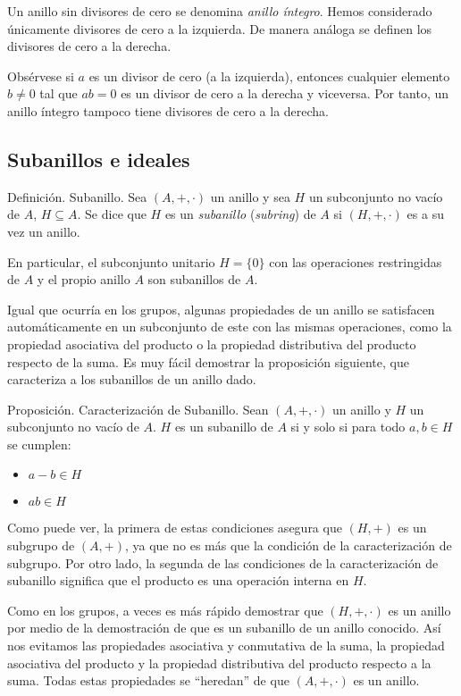 Un anillo sin divisores de cero se denomina \emph{anillo íntegro}. Hemos
considerado únicamente divisores de cero a la izquierda. De manera análoga
se definen los divisores de cero a la derecha.

Obsérvese si $a$ es un divisor de cero (a la izquierda), entonces cualquier
elemento $b \neq 0$ tal que $ab = 0$ es un divisor de cero a la derecha y
viceversa. Por tanto, un anillo íntegro tampoco tiene divisores de cero a la
derecha.




\subsection{Subanillos e ideales}

Definición. Subanillo. Sea $(A, +, \cdot)$ un anillo y sea $H$ un
subconjunto no vacío de $A$, $H \subseteq A$. Se dice que $H$ es un
\emph{subanillo} (\emph{subring}) de $A$ si $(H, +, \cdot)$ es a su vez un
anillo.

En particular, el subconjunto unitario $H = \{0\}$ con las operaciones
restringidas de $A$ y el propio anillo $A$ son subanillos de $A$.

Igual que ocurría en los grupos, algunas propiedades de un anillo se
satisfacen automáticamente en un subconjunto de este con las mismas
operaciones, como la propiedad asociativa del producto o la propiedad
distributiva del producto respecto de la suma. Es muy fácil demostrar la
proposición siguiente, que caracteriza a los subanillos de un anillo dado.

Proposición. Caracterización de Subanillo. Sean $(A, +, \cdot)$ un anillo y
$H$ un subconjunto no vacío de $A$. $H$ es un subanillo de $A$ si y solo si
para todo $a, b \in H$ se cumplen:

\begin{itemize}
  \item $a - b \in H$
  \item $ab \in H$
\end{itemize}

Como puede ver, la primera de estas condiciones asegura que $(H, +)$ es un
subgrupo de $(A, +)$, ya que no es más que la condición de la
caracterización de subgrupo. Por otro lado, la segunda de las condiciones de
la caracterización de subanillo significa que el producto es una operación
interna en $H$.


Como en los grupos, a veces es más rápido demostrar que $(H, +, \cdot)$ es
un anillo por medio de la demostración de que es un subanillo de un anillo
conocido. Así nos evitamos las propiedades asociativa y conmutativa de la
suma, la propiedad asociativa del producto y la propiedad distributiva del
producto respecto a la suma. Todas estas propiedades se ``heredan'' de que
$(A, +, \cdot)$ es un anillo.

